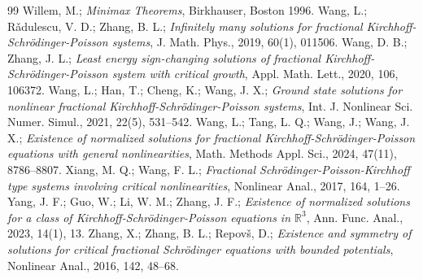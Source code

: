 \documentclass[10pt,a4paper]{amsart}
\numberwithin{equation}{section}
\begin{document}
\begin{thebibliography}{99}
 Willem, M.; \emph{Minimax Theorems}, Birkhauser, Boston 1996.
 Wang, L.; R\v{a}dulescu, V. D.; Zhang, B. L.; \emph{Infinitely many solutions for fractional Kirchhoff-Schr\"odinger-Poisson systems}, J. Math. Phys., 2019, 60(1), 011506.
 Wang, D. B.; Zhang, J. L.; \emph{Least energy sign-changing solutions of fractional Kirchhoff-Schr\"odinger-Poisson system with critical growth}, Appl. Math. Lett., 2020,  106, 106372.
 Wang, L.;  Han, T.;  Cheng, K.; Wang, J. X.; \emph{Ground state solutions for nonlinear fractional Kirchhoff-Schr\"odinger-Poisson systems}, Int. J. Nonlinear Sci. Numer. Simul., 2021,  22(5), 531--542.
 Wang, L.; Tang, L. Q.; Wang, J.; Wang, J. X.; \emph{Existence of normalized solutions for fractional Kirchhoff-Schr\"odinger-Poisson equations with general nonlinearities}, Math. Methods Appl. Sci., 2024, 47(11), 8786--8807.
 Xiang, M. Q.; Wang, F. L.; \emph{Fractional Schr\"odinger-Poisson-Kirchhoff type systems involving critical nonlinearities}, Nonlinear Anal., 2017, 164, 1--26.
 Yang, J. F.; Guo, W.; Li, W. M.; Zhang, J. F.; \emph{Existence of normalized solutions for a class of Kirchhoff-Schr\"odinger-Poisson equations in $\mathbb{R}^3$}, Ann. Func. Anal., 2023, 14(1), 13.
 Zhang, X.; Zhang, B. L.; Repov\v{s}, D.; \emph{Existence and symmetry of solutions for critical fractional Schr\"odinger equations with bounded potentials}, Nonlinear Anal., 2016, 142, 48--68.
\end{thebibliography}
\end{document}
